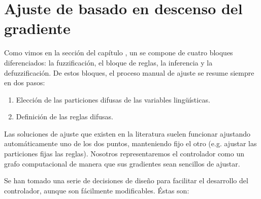 \chapter{Ajuste de  basado en descenso del gradiente}
\label{ch:fuzzy-controller-adjustment}

Como vimos en la sección  del capítulo , un  se compone de cuatro bloques diferenciados: la fuzzificación, el bloque de reglas, la inferencia y la defuzzificación. De estos bloques, el proceso manual de ajuste se resume siempre en dos pasos:

\begin{enumerate}
	\item Elección de las particiones difusas de las variables lingüísticas.
	\item Definición de las reglas difusas.
\end{enumerate}

Las soluciones de ajuste que existen en la literatura suelen funcionar ajustando automáticamente uno de los dos puntos, manteniendo fijo el otro (e.g. ajustar las particiones fijas las reglas). Nosotros representaremos el controlador como un grafo computacional de manera que sus gradientes sean sencillos de ajustar.

Se han tomado una serie de decisiones de diseño para facilitar el desarrollo del controlador, aunque son fácilmente modificables. Éstas son:

